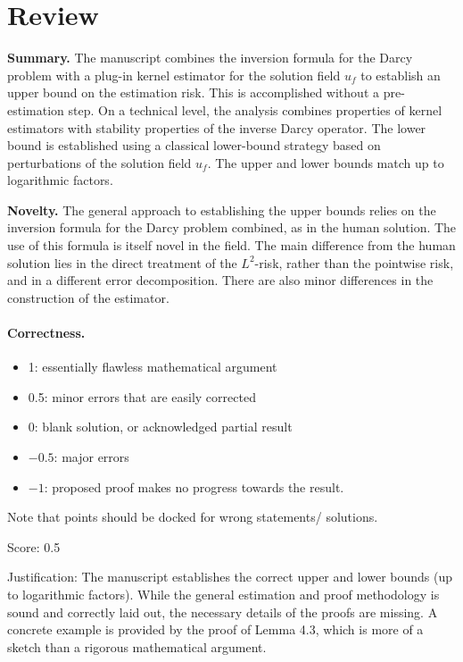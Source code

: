 \documentclass[11pt]{article}
\theoremstyle{remark}
\begin{document}
\maketitle

\section{Review}

\noindent \textbf{Summary.} The manuscript combines the inversion formula for the Darcy problem with a plug-in kernel estimator for the solution field $u_f$ to establish an upper bound on the estimation risk. This is accomplished without a pre-estimation step. On a technical level, the analysis combines properties of kernel estimators with stability properties of the inverse Darcy operator. The lower bound is established using a classical lower-bound strategy based on perturbations of the solution field $u_f$. The upper and lower bounds match up to logarithmic factors.

\noindent \textbf{Novelty.} The general approach to establishing the upper bounds relies on the inversion formula for the Darcy problem combined, as in the human solution. The use of this formula is itself novel in the field. The main difference from the human solution lies in the direct treatment of the $L^2$-risk, rather than the pointwise risk, and in a different error decomposition. There are also minor differences in the construction of the estimator.

\paragraph{Correctness.}
\begin{itemize}
	\item  1: essentially flawless mathematical argument
	\item  0.5: minor errors that are easily corrected
	\item  0: blank solution, or acknowledged partial result
	\item  $-0.5$: major errors
	\item  $-1$: proposed proof makes no progress towards the result.
\end{itemize}
Note that points should be docked for wrong statements/ solutions.

\noindent Score: 0.5

\noindent Justification: The manuscript establishes the correct upper and lower bounds (up to logarithmic factors). While the general estimation and proof methodology is sound and correctly laid out, the necessary details of the proofs are missing. A concrete example is provided by the proof of Lemma 4.3, which is more of a sketch than a rigorous mathematical argument.
\end{document}
